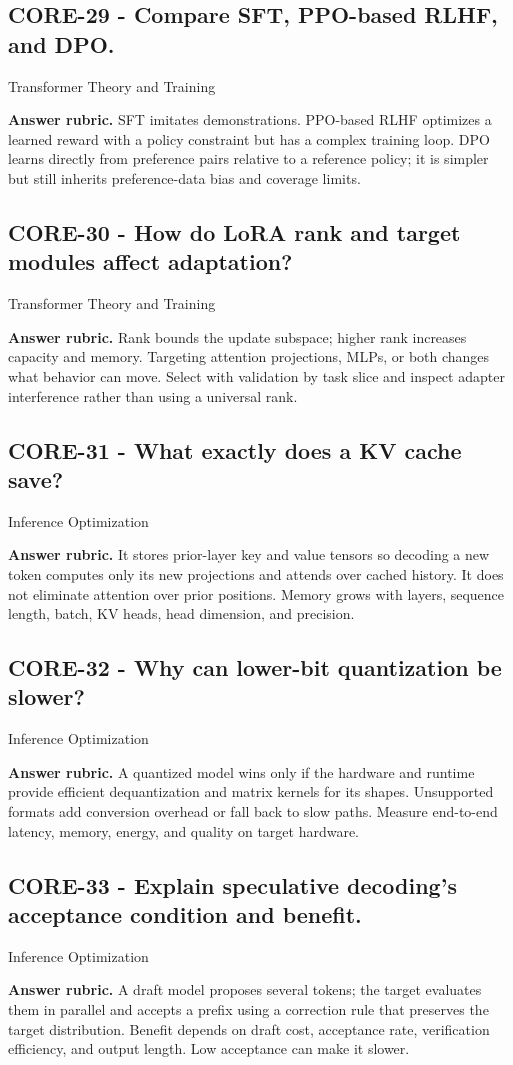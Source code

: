 \subsection*{CORE-29 - Compare SFT, PPO-based RLHF, and DPO.}
 \quad Transformer Theory and Training
\par\smallskip\textbf{Answer rubric.} SFT imitates demonstrations. PPO-based RLHF optimizes a learned reward with a policy constraint but has a complex training loop. DPO learns directly from preference pairs relative to a reference policy; it is simpler but still inherits preference-data bias and coverage limits.
\subsection*{CORE-30 - How do LoRA rank and target modules affect adaptation?}
 \quad Transformer Theory and Training
\par\smallskip\textbf{Answer rubric.} Rank bounds the update subspace; higher rank increases capacity and memory. Targeting attention projections, MLPs, or both changes what behavior can move. Select with validation by task slice and inspect adapter interference rather than using a universal rank.
\subsection*{CORE-31 - What exactly does a KV cache save?}
 \quad Inference Optimization
\par\smallskip\textbf{Answer rubric.} It stores prior-layer key and value tensors so decoding a new token computes only its new projections and attends over cached history. It does not eliminate attention over prior positions. Memory grows with layers, sequence length, batch, KV heads, head dimension, and precision.
\subsection*{CORE-32 - Why can lower-bit quantization be slower?}
 \quad Inference Optimization
\par\smallskip\textbf{Answer rubric.} A quantized model wins only if the hardware and runtime provide efficient dequantization and matrix kernels for its shapes. Unsupported formats add conversion overhead or fall back to slow paths. Measure end-to-end latency, memory, energy, and quality on target hardware.
\subsection*{CORE-33 - Explain speculative decoding's acceptance condition and benefit.}
 \quad Inference Optimization
\par\smallskip\textbf{Answer rubric.} A draft model proposes several tokens; the target evaluates them in parallel and accepts a prefix using a correction rule that preserves the target distribution. Benefit depends on draft cost, acceptance rate, verification efficiency, and output length. Low acceptance can make it slower.

